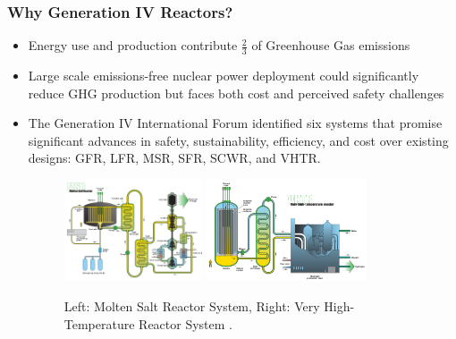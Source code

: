 \begin{frame}
    \frametitle{Why Generation IV Reactors?}
    \begin{itemize}
      \item Energy use and production contribute $\frac{2}{3}$ of Greenhouse Gas 
      emissions \cite{noauthor_climate_2018}
      \item  Large scale emissions-free nuclear power deployment could 
      significantly reduce GHG production but faces both cost and perceived 
      safety challenges 
      \item The Generation IV International Forum identified six systems 
      that promise significant advances in safety, sustainability, efficiency, 
      and cost over existing designs: GFR, LFR, MSR, SFR, SCWR, and VHTR. 
      \begin{figure}[htbp!]
          \includegraphics[height=3cm]{figures/msr}
          \hspace{1cm}
          \includegraphics[height=3cm]{figures/vhtr}
          \caption{Left: Molten Salt Reactor System, Right: Very High-Temperature
          Reactor System \cite{gif_technology_2002}. }
      \end{figure}
    \end{itemize}
  \end{frame}

